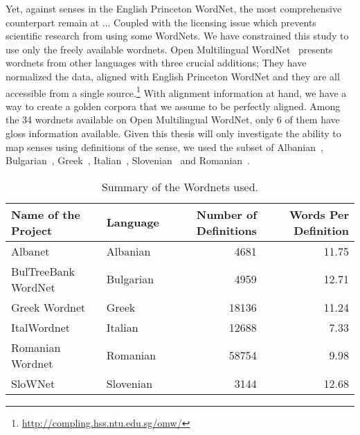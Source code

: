 Yet, against %
senses in the English Princeton WordNet, the most comprehensive counterpart remain at ... %
Coupled with the licensing issue which prevents scientific research from using some WordNets.
We have constrained this study to use only the freely available wordnets.
Open Multilingual WordNet~\cite{bond_survey_2012} presents wordnets from other languages with three crucial additions; %
They have normalized the data, aligned with English Princeton WordNet and they are all accessible from a single source.\footnote{\url{http://compling.hss.ntu.edu.sg/omw/}}
With alignment information at hand, we have a way to create a golden corpora that we assume to be perfectly aligned.
Among the 34 wordnets available on Open Multilingual WordNet, only 6 of them have gloss information available.
Given this thesis will only investigate the ability to map senses using definitions of the sense, we used the subset of Albanian~\cite{ruci_current_2008}, Bulgarian~\cite{simov_constructing_2010}, Greek~\cite{stamou_exploring_2004}, Italian~\cite{pianta_multiwordnet_2002}, Slovenian~\cite{fiser_slownet_2012} and Romanian~\cite{tufis_romanian_2008}.
\begin{table*}[!hbp]
    \begin{center}
        \caption{Summary of the Wordnets used.}\label{tab:summary_table}
        \begin{tabular}{llrr}
            \toprule%
            \textbf{Name of the Project} & \textbf{Language} & \textbf{Number of Definitions} & \textbf{Words Per Definition} \\
            \midrule%
            Albanet & Albanian & 4681 & 11.75 \\
            BulTreeBank WordNet & Bulgarian & 4959 & 12.71 \\
            Greek Wordnet & Greek & 18136 & 11.24 \\
            ItalWordnet & Italian & 12688 & 7.33 \\
            Romanian Wordnet & Romanian & 58754 & 9.98 \\
            SloWNet & Slovenian & 3144 & 12.68 \\
            \bottomrule %
        \end{tabular}
    \end{center}
\end{table*}

